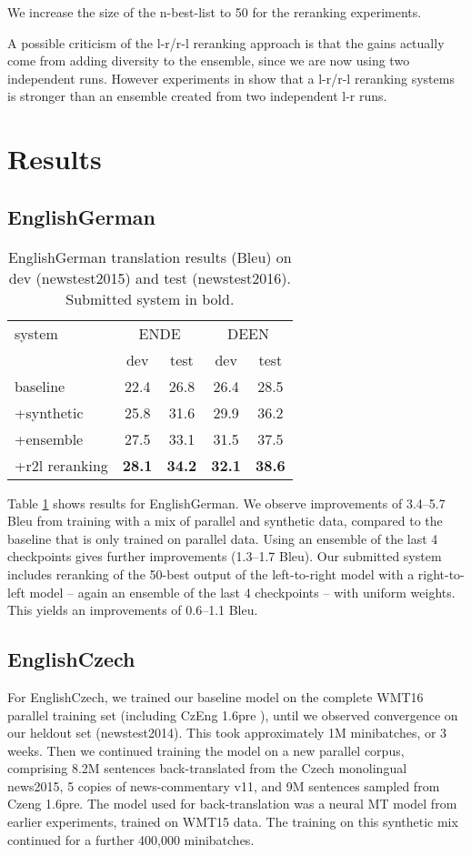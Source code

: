 \documentclass[11pt]{article}
\begin{document}
We increase the size of the n-best-list to 50 for the reranking experiments.

A possible criticism of the l-r/r-l reranking approach is that the gains actually come from adding diversity to the ensemble, since we
are now using two independent runs. However experiments in \cite{liu2016} show that a l-r/r-l reranking systems is
stronger than an ensemble created from two independent l-r runs.


\section{Results}

\subsection{EnglishGerman}

\begin{table}
\centering
\begin{tabular}{l|cc|cc}
system & \multicolumn{2}{c|}{ENDE} & \multicolumn{2}{c}{DEEN}\\
& dev & test & dev & test\\
\hline
baseline & 22.4 & 26.8 &26.4 & 28.5\\+synthetic & 25.8 & 31.6&29.9 & 36.2\\ +ensemble & 27.5 & 33.1 &31.5 & 37.5\\ +r2l reranking & \textbf{28.1} & \textbf{34.2} &\textbf{32.1} & \textbf{38.6}\\ \end{tabular}
\caption{EnglishGerman translation results ({\sc Bleu}) on dev (newstest2015) and test (newstest2016). Submitted system in bold.}
\label{results-de}
\end{table}

Table \ref{results-de} shows results for EnglishGerman.
We observe improvements of 3.4--5.7 {\sc Bleu} from training with a mix of parallel and synthetic data, compared to the baseline that is only trained on parallel data.
Using an ensemble of the last 4 checkpoints gives further improvements (1.3--1.7 {\sc Bleu}).
Our submitted system includes reranking of the 50-best output of the left-to-right model with a right-to-left model -- again an ensemble of the last 4 checkpoints -- with uniform weights.
This yields an improvements of 0.6--1.1 {\sc Bleu}.

\subsection{EnglishCzech}
For EnglishCzech, we trained our baseline model on the complete WMT16 parallel training set (including CzEng 1.6pre \cite{czeng16:2016}), until we observed convergence on our
heldout set (newstest2014). This took approximately 1M minibatches, or 3 weeks. Then we continued training the model on a new parallel corpus, comprising
8.2M sentences back-translated from the Czech monolingual news2015, 5 copies of news-commentary v11, and 9M sentences sampled from Czeng 1.6pre. The
model used for back-translation was a neural MT model from earlier experiments, trained on WMT15 data. The training
on this synthetic mix continued for a further 400,000 minibatches.
\end{document}
